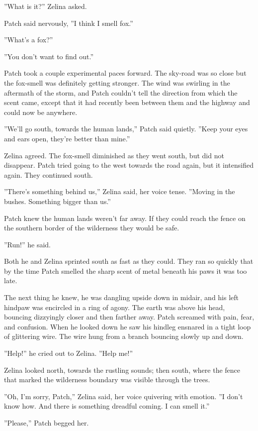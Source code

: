 \documentclass[12pt]{book}
\begin{document}
''What is it?'' Zelina asked.

Patch said nervously, ''I think I smell fox.''

''What's a fox?''

''You don't want to find out.''

Patch took a couple experimental paces forward. The sky-road was so close %
but the fox-smell was definitely getting stronger. The wind was swirling in the aftermath of the storm, and Patch couldn't tell the direction from which the scent came, except that it had recently been between them and the highway %
and could now be anywhere.

''We'll go south, towards the human lands,'' Patch said quietly. ''Keep your eyes and ears open, they're better than mine.''

Zelina agreed. The fox-smell diminished as they went south, but did not disappear. Patch tried going to the west towards the road again, but it intensified again. They continued south.

''There's something behind us,'' Zelina said, her voice tense. ''Moving in the bushes. Something bigger than us.''

Patch knew the human lands weren't far away. If they could reach the fence on the southern border of the wilderness they would be safe.

''Run!'' he said.

Both he and Zelina sprinted south as fast as they could. They ran so quickly that by the time Patch smelled the sharp scent of metal beneath his paws it was too late.

The next thing he knew, he was dangling upside down in midair, and his left hindpaw was encircled in a ring of agony. The earth was above his head, bouncing dizzyingly closer and then farther away. Patch screamed with pain, fear, and confusion. When he looked down he saw his hindleg ensnared in a tight loop of glittering wire. The wire hung from a branch bouncing slowly up and down.

''Help!'' he cried out to Zelina. ''Help me!''

Zelina looked north, towards the rustling sounds; then south, where the fence that marked the wilderness boundary was visible through the trees.

''Oh, I'm sorry, Patch,'' Zelina said, her voice quivering with emotion. ''I don't know how. And there is something dreadful coming. I can smell it.''

''Please,'' Patch begged her.
\end{document}
